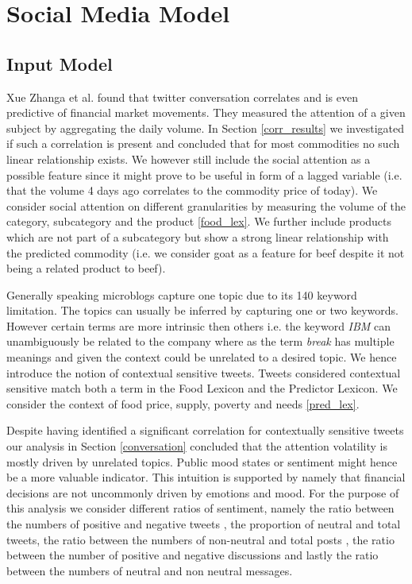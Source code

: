 \clearpage

\section{Social Media Model}

\subsection{Input Model }

Xue Zhanga et al. found that twitter conversation correlates and is even predictive of financial market movements. They measured the attention of a given subject by aggregating the daily volume. In Section \ref{corr_results} we investigated if such a correlation is present and concluded that for most commodities no such linear relationship exists. We however still include the social attention as a possible feature since it might prove to be useful in form of a lagged variable (i.e. that the volume 4 days ago  correlates to the commodity price of today). We consider social attention on different granularities  by measuring the volume of the category, subcategory and the product \ref{food_lex}. We further include products which are not part of a subcategory but show a strong linear relationship with the predicted commodity (i.e. we consider goat as a feature for beef despite it not being a related product to beef). 

 Generally speaking microblogs capture one topic due to its 140 keyword limitation. The topics can usually be inferred by capturing one or two keywords. However certain terms are more intrinsic then others i.e. the keyword \emph{IBM} can unambiguously be related to the company where as the  term \emph{break} has multiple meanings and given the context could be unrelated to a desired topic. We hence introduce the notion of contextual sensitive tweets. Tweets considered contextual sensitive match both a term in the Food Lexicon and the Predictor Lexicon. We consider the context of food price, supply, poverty and needs \ref{pred_lex}. 
 
 
 Despite having identified  a significant correlation for contextually sensitive tweets our analysis in Section \ref{conversation} concluded that the attention volatility is mostly driven by unrelated topics. Public mood states or sentiment might hence be a more valuable indicator. This intuition is supported by \cite{nofsinger05} namely that financial decisions are not uncommonly driven by emotions and mood. For the purpose of this analysis we consider different ratios of sentiment, namely the ratio between the numbers of positive and negative tweets \cite{Nguyen12}, the proportion of neutral and total tweets,  the ratio between the numbers of non-neutral and total posts \cite{Zhang09}, the ratio between the number of positive and negative discussions and lastly the ratio between the numbers of neutral and non neutral messages. 

